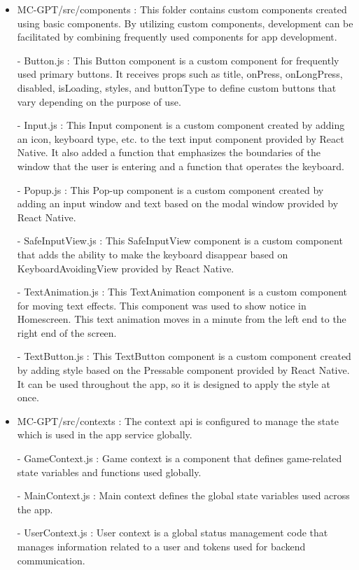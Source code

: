 \documentclass[conference]{IEEEtran}
\begin{document}
\begin{itemize}
                \item MC-GPT/src/components : This folder contains custom components created using basic components. By utilizing custom components, development can be facilitated by combining frequently used components for app development.
                    \item[-] Button.js : This Button component is a custom component for frequently used primary buttons. It receives props such as title, onPress, onLongPress, disabled, isLoading, styles, and buttonType to define custom buttons that vary depending on the purpose of use.
                    \item[-] Input.js : This Input component is a custom component created by adding an icon, keyboard type, etc. to the text input component provided by React Native. It also added a function that emphasizes the boundaries of the window that the user is entering and a function that operates the keyboard.
                    \item[-] Popup.js : This Pop-up component is a custom component created by adding an input window and text based on the modal window provided by React Native.
                    \item[-] SafeInputView.js : This SafeInputView component is a custom component that adds the ability to make the keyboard disappear based on KeyboardAvoidingView provided by React Native.
                    \item[-] TextAnimation.js : This TextAnimation component is a custom component for moving text effects. This component was used to show notice in Homescreen. This text animation moves in a minute from the left end to the right end of the screen.
                    \item[-] TextButton.js : This TextButton component is a custom component created by adding style based on the Pressable component provided by React Native. It can be used throughout the app, so it is designed to apply the style at once.
                \vspace{3mm}
                
                \item MC-GPT/src/contexts : The context api is configured to manage the state which is used in the app service globally.
                    \item[-] GameContext.js : Game context is a component that defines game-related state variables and functions used globally.
                    \item[-] MainContext.js : Main context defines the global state variables used across the app.
                    \item[-] UserContext.js : User context is a global status management code that manages information related to a user and tokens used for backend communication.
                \vspace{3mm}
                

\end{itemize}
\end{document}

